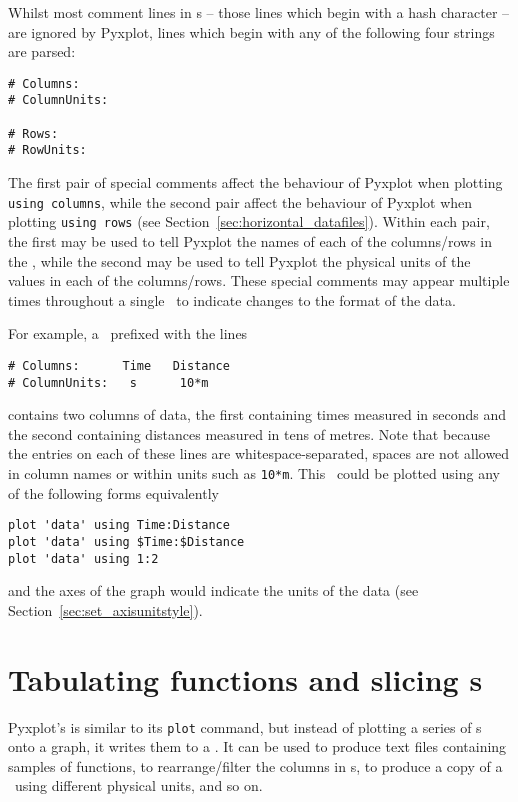 Whilst most comment lines in \datafile s -- those lines which begin with a hash
character -- are ignored by Pyxplot, lines which begin with any of the
following four strings are parsed:
\begin{verbatim}
# Columns:
# ColumnUnits:

# Rows:
# RowUnits:
\end{verbatim}
The first pair of special comments affect the behaviour of Pyxplot when
plotting {\tt using columns}, while the second pair affect the behaviour of
Pyxplot when plotting {\tt using rows} (see
Section~\ref{sec:horizontal_datafiles}). Within each pair, the first may be
used to tell Pyxplot the names of each of the columns/rows in the \datafile,
while the second may be used to tell Pyxplot the physical units of the values
in each of the columns/rows. These special comments may appear multiple times
throughout a single \datafile\ to indicate changes to the format of the data.

For example, a \datafile\ prefixed with the lines
\begin{verbatim}
# Columns:      Time   Distance
# ColumnUnits:   s      10*m
\end{verbatim}
contains two columns of data, the first containing times measured in seconds
and the second containing distances measured in tens of metres. Note that
because the entries on each of these lines are whitespace-separated, spaces are
not allowed in column names or within units such as {\tt 10*m}. This \datafile\
could be plotted using any of the following forms equivalently
\begin{verbatim}
plot 'data' using Time:Distance
plot 'data' using $Time:$Distance
plot 'data' using 1:2
\end{verbatim}
and the axes of the graph would indicate the units of the data (see
Section~\ref{sec:set_axisunitstyle}).

\section{Tabulating functions and slicing \datafile s}
\label{sec:tabulate}

Pyxplot's  is similar to its {\tt plot} command, but instead
of plotting a series of \datapoint s onto a graph, it writes them to a
\datafile. It can be used to produce text files containing samples of
functions, to rearrange/filter the columns in \datafile s, to produce a copy of
a \datafile\ using different physical units, and so on.

